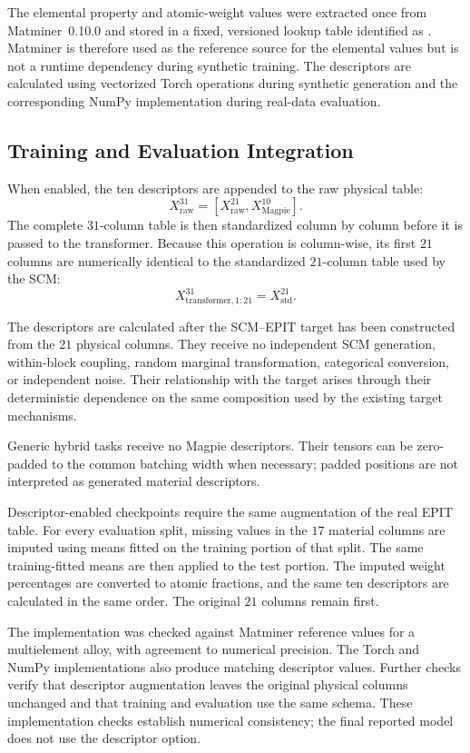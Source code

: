 \documentclass{article}
\begin{document}
The elemental property and atomic-weight values were extracted once from
Matminer~0.10.0 and stored in a fixed, versioned lookup table identified as
. Matminer is therefore used as the
reference source for the elemental values but is not a runtime dependency
during synthetic training. The descriptors are calculated using vectorized
Torch operations during synthetic generation and the corresponding NumPy
implementation during real-data evaluation.

\subsection{Training and Evaluation Integration}

When enabled, the ten descriptors are appended to the raw physical table:
\[
X_{\mathrm{raw}}^{31}
=[X_{\mathrm{raw}}^{21},X_{\mathrm{Magpie}}^{10}].
\]
The complete \(31\)-column table is then standardized column by column before
it is passed to the transformer. Because this operation is column-wise, its
first \(21\) columns are numerically identical to the standardized
\(21\)-column table used by the SCM:
\[
X_{\mathrm{transformer},1:21}^{31}=X_{\mathrm{std}}^{21}.
\]

The descriptors are calculated after the SCM--EPIT target has been constructed
from the \(21\) physical columns. They receive no independent SCM generation,
within-block coupling, random marginal transformation, categorical conversion,
or independent noise. Their relationship with the target arises through their
deterministic dependence on the same composition used by the existing target
mechanisms.

Generic hybrid tasks receive no Magpie descriptors. Their tensors can be
zero-padded to the common batching width when necessary; padded positions are
not interpreted as generated material descriptors.

Descriptor-enabled checkpoints require the same augmentation of the real
EPIT table. For every evaluation split, missing values in the \(17\)
material columns are imputed using means fitted on the training portion of
that split. The same training-fitted means are then applied to the test
portion. The imputed weight percentages are converted to atomic fractions,
and the same ten descriptors are calculated in the same order. The original
\(21\) columns remain first.

The implementation was checked against Matminer reference values for a
multielement alloy, with agreement to numerical precision. The Torch and NumPy
implementations also produce matching descriptor values. Further checks
verify that descriptor augmentation leaves the original physical columns
unchanged and that training and evaluation use the same schema. These
implementation checks establish numerical consistency; the final reported
model does not use the descriptor option.
\end{document}

